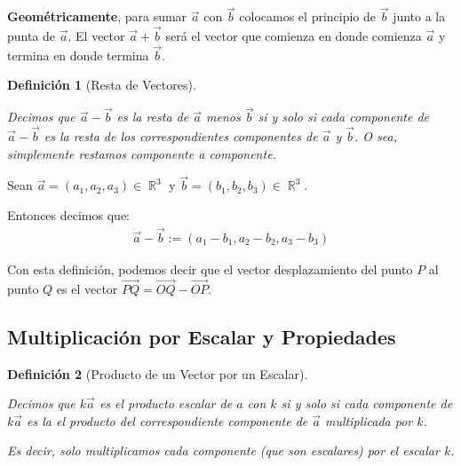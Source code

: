 \documentclass[12pt, fleqn]{report}                             %
\newtheorem{Definition}{Definición}[section]                    %
\DeclareMathOperator \Reals        {\mathbb{R}}                 %
\newcommand{\lVec}[1]{\overrightarrow{#1}}                      %
\begin{document}
                \textbf{Geométricamente}, para sumar $\vec{a}$ con $\vec{b}$ colocamos el principio de
                $\vec{b}$ junto a la punta de $\vec{a}$. El vector $\vec{a} + \vec{b}$ será el vector
                que comienza en donde comienza $\vec{a}$ y termina en donde termina $\vec{b}$.
                
                \vspace{2em}

                \begin{Definition}[Resta de Vectores]
                    \label{DefRestaVectores}

                    Decimos que $\vec{a}-\vec{b}$ es la resta de $\vec{a}$ menos $\vec{b}$ si y solo si 
                    cada componente de $\vec{a}-\vec{b}$ es la resta de los correspondientes componentes
                    de $\vec{a}$ y $\vec{b}$.
                    O sea, simplemente restamos componente a componente.
                    
                \end{Definition}

                Sean $\vec{a} = (a_1, a_2, a_3) \in \Reals^3$ y $\vec{b}=(b_1, b_2, b_3) \in \Reals^3$.

                Entonces decimos que:
                \begin{align}
                    \vec{a} - \vec{b} := (a_1 - b_1, a_2 - b_2, a_3 - b_3)
                \end{align}
            
                Con esta definición, podemos decir que el vector desplazamiento del punto $P$ al punto $Q$
                es el vector $\lVec{PQ} = \lVec{OQ} - \lVec{OP}$.
                
            \clearpage
            \subsection{Multiplicación por Escalar y Propiedades}

                \begin{Definition}[Producto de un Vector por un Escalar]
                    \label{DefProductoVectorEscalar}

                    Decimos que $k \vec{a}$ es el producto escalar de $a$ con $k$
                    si y solo si cada componente de $k \vec{a}$ es la el producto del correspondiente componente
                    de $\vec{a}$ multiplicada por $k$.

                    Es decir, solo multiplicamos cada componente (que son escalares) por el escalar $k$.

                \end{Definition}
\end{document}
